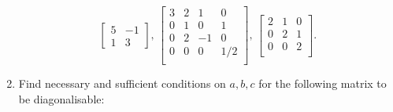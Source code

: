 \documentclass[12pt]{article}
\begin{document}
\begin{enumerate}[leftmargin=*]
	 \begin{equation*} 
	 	\begin{bmatrix}
	 		5 & -1 \\
	 		1 & 3
	 	\end{bmatrix},\, 
	 	\begin{bmatrix}
	 		3 & 2 & 1 & 0 \\
	 		0 & 1 & 0 & 1 \\
	 		0 & 2 & -1 & 0 \\
	 		0 & 0 & 0 & 1/2 \\
	 	\end{bmatrix},\,
	 	\begin{bmatrix}
	 		2 & 1 & 0 \\
	 		0 & 2 & 1 \\ 
	 		0 & 0 & 2 \\
	 	\end{bmatrix}.
	 \end{equation*}
	 \item Find necessary and sufficient conditions on $a, b, c$ for the following matrix to be diagonalisable:


\end{enumerate}
\end{document}
